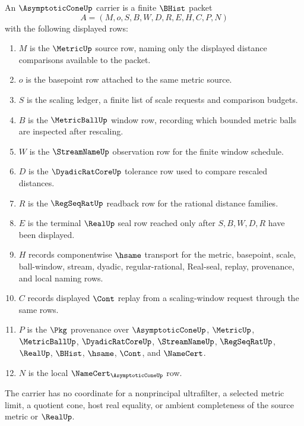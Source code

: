 \begin{definition}
\label{def:asymptotic-cone-carrier}
An $\AsymptoticConeUp$ carrier is a finite $\BHist$ packet
$$
A=(M,o,S,B,W,D,R,E,H,C,P,N)
$$
with the following displayed rows:
\begin{enumerate}
\item $M$ is the $\MetricUp$ source row, naming only the displayed distance comparisons available to the packet.
\item $o$ is the basepoint row attached to the same metric source.
\item $S$ is the scaling ledger, a finite list of scale requests and comparison budgets.
\item $B$ is the $\MetricBallUp$ window row, recording which bounded metric balls are inspected after rescaling.
\item $W$ is the $\StreamNameUp$ observation row for the finite window schedule.
\item $D$ is the $\DyadicRatCoreUp$ tolerance row used to compare rescaled distances.
\item $R$ is the $\RegSeqRatUp$ readback row for the rational distance families.
\item $E$ is the terminal $\RealUp$ seal row reached only after $S,B,W,D,R$ have been displayed.
\item $H$ records componentwise $\hsame$ transport for the metric, basepoint, scale, ball-window, stream, dyadic, regular-rational, Real-seal, replay, provenance, and local naming rows.
\item $C$ records displayed $\Cont$ replay from a scaling-window request through the same rows.
\item $P$ is the $\Pkg$ provenance over $\AsymptoticConeUp$, $\MetricUp$, $\MetricBallUp$, $\DyadicRatCoreUp$, $\StreamNameUp$, $\RegSeqRatUp$, $\RealUp$, $\BHist$, $\hsame$, $\Cont$, and $\NameCert$.
\item $N$ is the local $\NameCert_{\AsymptoticConeUp}$ row.
\end{enumerate}
The carrier has no coordinate for a nonprincipal ultrafilter, a selected metric limit, a quotient cone, host real equality, or ambient completeness of the source metric or $\RealUp$.
\end{definition}

